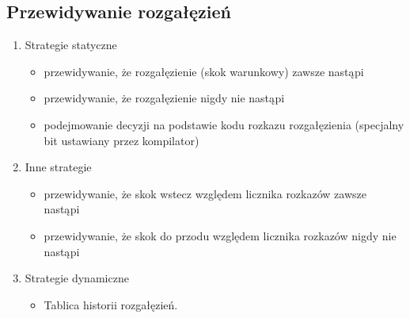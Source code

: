 \documentclass[a4paper,twoside]{article}
\begin{document}
    	\subsection*{Przewidywanie rozgałęzień}
    	\begin{enumerate}
    		\item Strategie statyczne
    		\begin{itemize}
    			\item przewidywanie, że rozgałęzienie (skok warunkowy) zawsze nastąpi
    			\item przewidywanie, że rozgałęzienie nigdy nie nastąpi
    			\item podejmowanie decyzji na podstawie kodu rozkazu rozgałęzienia (specjalny bit ustawiany przez kompilator)
    		\end{itemize}
    		\item Inne strategie
    		\begin{itemize}
    			\item przewidywanie, że skok wstecz względem licznika rozkazów zawsze nastąpi
    			\item przewidywanie, że skok do przodu względem licznika rozkazów nigdy nie nastąpi
    		\end{itemize}
    		\item Strategie dynamiczne
    		\begin{itemize}
    			\item Tablica historii rozgałęzień.
    		\end{itemize}

\end{enumerate}
\end{document}
